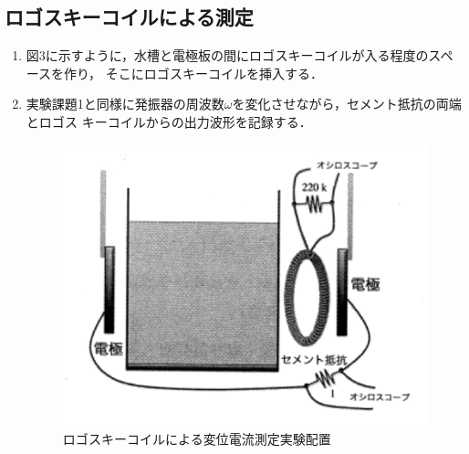 \subsection{ロゴスキーコイルによる測定}
\begin{enumerate}
    \item 図3に示すように，水槽と電極板の間にロゴスキーコイルが入る程度のスペースを作り，
    そこにロゴスキーコイルを挿入する．
    \item 実験課題1と同様に発振器の周波数$\omega$を変化させながら，セメント抵抗の両端とロゴス
    キーコイルからの出力波形を記録する．
    \begin{figure}[H]
        \centering
        \includegraphics[scale=0.75]{figure3.pdf}
        \caption{ロゴスキーコイルによる変位電流測定実験配置}
    \end{figure}
\end{enumerate}